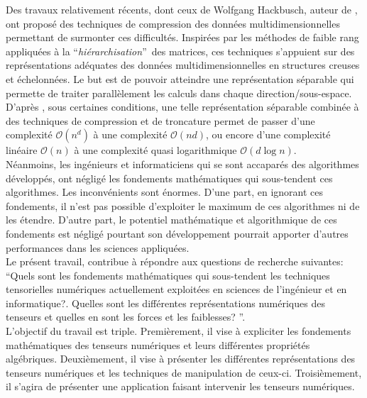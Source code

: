 \documentclass[11pt,a4paper,oneside]{book}
\begin{document}
 Des travaux relativement récents, dont ceux de Wolfgang Hackbusch, auteur de \cite{hackbusch2012tensor}, ont proposé des techniques de compression des données multidimensionnelles permettant de surmonter ces difficultés. Inspirées par les méthodes de faible rang appliquées à la \textquotedblleft\textit{hiérarchisation}\textquotedblright\, des matrices, ces techniques s'appuient sur des représentations adéquates des données multidimensionnelles en structures creuses et échelonnées. Le but est de pouvoir atteindre une représentation séparable qui permette de traiter parallèlement les calculs dans chaque direction/sous-espace. D'après \cite[p.11]{hackbusch2012tensor}, sous certaines conditions, une telle représentation séparable combinée à des techniques de compression et de troncature permet de passer d'une complexité $\mathcal{O}(n^{d})$ à une complexité $\mathcal{O}(n{d})$, ou encore d'une complexité linéaire $\mathcal{O}(n)$ à une complexité quasi logarithmique $\mathcal{O}(d\log{}n)$.\\


Néanmoins, les ingénieurs et informaticiens qui se sont accaparés des algorithmes développés, ont négligé les fondements mathématiques qui sous-tendent ces algorithmes. Les inconvénients sont énormes. D'une part, en ignorant ces fondements, il n'est pas possible d'exploiter le maximum de ces algorithmes ni  de les étendre. D'autre part, le potentiel mathématique et algorithmique de ces fondements est négligé pourtant son développement pourrait apporter d'autres performances dans les sciences appliquées.\\

Le présent travail, contribue à répondre aux questions de recherche suivantes: \textquotedblleft Quels sont les fondements mathématiques qui sous-tendent les techniques tensorielles numériques actuellement exploitées en sciences de l'ingénieur et en informatique?. Quelles sont les différentes représentations numériques des tenseurs et quelles en sont les forces et les faiblesses? \textquotedblright. \\

L'objectif du travail est triple. Premièrement, il vise à expliciter les fondements mathématiques des tenseurs numériques et leurs différentes propriétés algébriques. Deuxièmement, il vise à présenter les différentes représentations des tenseurs numériques et les techniques de manipulation de ceux-ci. Troisièmement, il s'agira de présenter une application faisant intervenir les tenseurs numériques.\\
\thispagestyle{myheadings}
\end{document}
